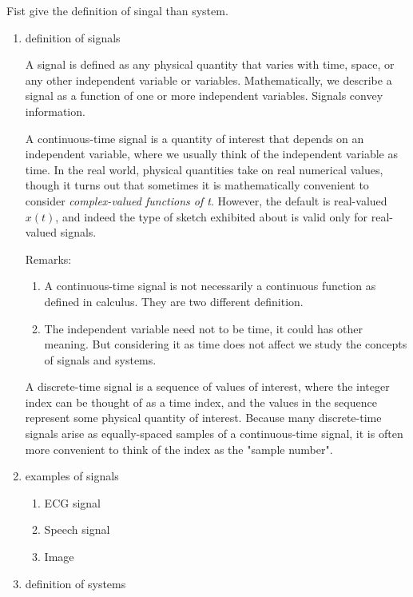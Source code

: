 \documentclass[koma,utopia,letterpaper,captions=tableheading,11pt,listings-sv,microtype,paralist,colorlinks=true,urlcolor=blue]{org-article}
\begin{document}
Fist give the definition of singal than system.
\begin{enumerate}
\item definition of signals
\label{sec:org9e28d14}


A signal is defined as any physical quantity that varies with time, space, or
any other independent variable or variables. Mathematically, we describe a
signal as a function of one or more independent variables. Signals convey
information.

A continuous-time signal is a quantity of interest that depends on an
independent variable, where we usually think of the independent variable as
time. In the real world, physical quantities take on real numerical values,
though it turns out that sometimes it is mathematically convenient to consider
\emph{complex-valued functions of t}. However, the default is real-valued \(x(t)\),
and indeed the type of sketch exhibited about is valid only for real-valued
signals.

Remarks:
\begin{enumerate}
\item A continuous-time signal is not necessarily a continuous function as defined
in calculus. They are two different definition.
\item The independent variable need not to be time, it could has other meaning. But
considering it as time does not affect we study the concepts of signals and
systems.
\end{enumerate}

A discrete-time signal is a sequence of values of interest, where the integer
index can be thought of as a time index, and the values in the sequence
represent some physical quantity of interest. Because many discrete-time signals
arise as equally-spaced samples of a continuous-time signal, it is often more
convenient to think of the index as the "sample number".
\item examples of signals
\label{sec:orge975172}

\begin{enumerate}
\item ECG signal
\label{sec:orgc8f647d}

\item Speech signal
\label{sec:org934f365}

\item Image
\label{sec:org28628c9}
\end{enumerate}



\item definition of systems
\label{sec:orgce71be0}



\end{enumerate}
\end{document}

